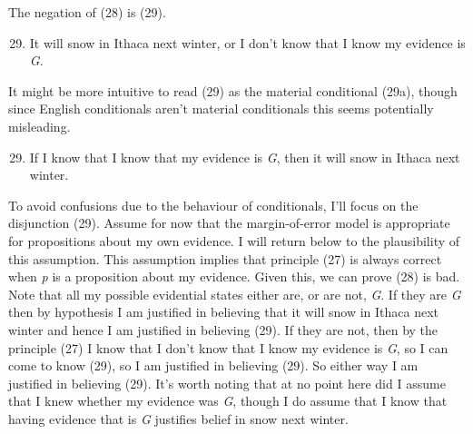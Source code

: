 The negation of (28) is (29).

\begin{enumerate}
\setcounter{enumi}{28}
\item
  It will snow in Ithaca next winter, or I don't know that I know my
  evidence is \emph{G}.
\end{enumerate}

It might be more intuitive to read (29) as the material conditional
(29a), though since English conditionals aren't material conditionals
this seems potentially misleading.

\begin{enumerate}
\setcounter{enumi}{28}
\item
  If I know that I know that my evidence is \emph{G}, then it will snow
  in Ithaca next winter.
\end{enumerate}

To avoid confusions due to the behaviour of conditionals, I'll focus on
the disjunction (29). Assume for now that the margin-of-error model is
appropriate for propositions about my own evidence. I will return below
to the plausibility of this assumption. This assumption implies that
principle (27) is always correct when \emph{p} is a proposition about my
evidence. Given this, we can prove (28) is bad. Note that all my
possible evidential states either are, or are not, \emph{G}. If they are
\emph{G} then by hypothesis I am justified in believing that it will
snow in Ithaca next winter and hence I am justified in believing (29).
If they are not, then by the principle (27) I know that I don't know
that I know my evidence is \emph{G}, so I can come to know (29), so I am
justified in believing (29). So either way I am justified in believing
(29). It's worth noting that at no point here did I assume that I knew
whether my evidence was \emph{G}, though I do assume that I know that
having evidence that is \emph{G} justifies belief in snow next winter.


